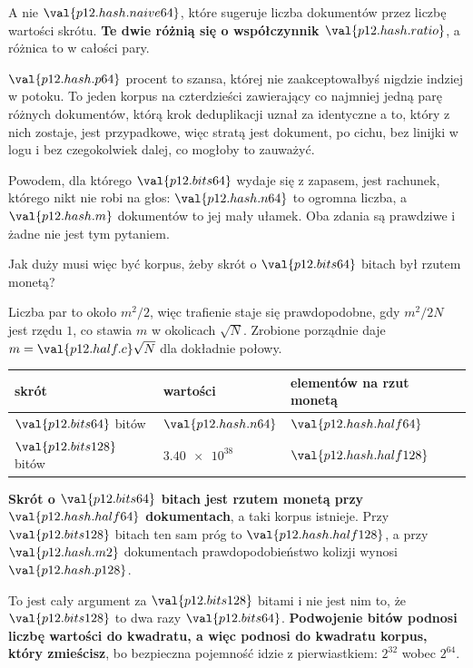 \begin{fr}
A nie $\val{p12.hash.naive64}$, które sugeruje liczba dokumentów przez liczbę
wartości skrótu. \textbf{Te dwie różnią się o współczynnik
$\val{p12.hash.ratio}$}, a różnica to w całości pary.

\begin{aibox}
$\val{p12.hash.p64}$ procent to szansa, której nie zaakceptowałbyś nigdzie
indziej w potoku. To jeden korpus na czterdzieści zawierający co najmniej
jedną parę różnych dokumentów, którą krok deduplikacji uznał za identyczne
\dash{} a to, który z nich zostaje, jest przypadkowe, więc stratą jest
dokument, po cichu, bez linijki w logu i bez czegokolwiek dalej, co mogłoby to
zauważyć.

Powodem, dla którego $\val{p12.bits64}$ wydaje się z zapasem, jest rachunek,
którego nikt nie robi na głos: $\val{p12.hash.n64}$ to ogromna liczba, a
$\val{p12.hash.m}$ dokumentów to jej mały ułamek. Oba zdania są prawdziwe i
żadne nie jest tym pytaniem.
\end{aibox}
\end{fr}

\begin{fr}
Jak duży musi więc być korpus, żeby skrót o $\val{p12.bits64}$ bitach był
rzutem monetą?

Liczba par to około $m^{2}/2$, więc trafienie staje się prawdopodobne, gdy
$m^{2}/2N$ jest rzędu $1$, co stawia $m$ w okolicach $\sqrt{N}$. Zrobione
porządnie daje $m = \val{p12.half.c}\sqrt{N}$ dla dokładnie połowy.

\begin{center}
\begin{tabular}{lll}
\toprule
\textbf{skrót} & \textbf{wartości} & \textbf{elementów na rzut monetą} \\
\midrule
$\val{p12.bits64}$ bitów & $\val{p12.hash.n64}$ & $\val{p12.hash.half64}$ \\
$\val{p12.bits128}$ bitów & $\num{3.40e38}$ & $\val{p12.hash.half128}$ \\
\bottomrule
\end{tabular}
\end{center}

\textbf{Skrót o $\val{p12.bits64}$ bitach jest rzutem monetą przy
$\val{p12.hash.half64}$ dokumentach}, a taki korpus istnieje. Przy
$\val{p12.bits128}$ bitach ten sam próg to $\val{p12.hash.half128}$, a przy
$\val{p12.hash.m2}$ dokumentach prawdopodobieństwo kolizji wynosi
$\val{p12.hash.p128}$.

To jest cały argument za $\val{p12.bits128}$ bitami i nie jest nim to, że
$\val{p12.bits128}$ to dwa razy $\val{p12.bits64}$. \textbf{Podwojenie bitów
podnosi liczbę wartości do kwadratu, a więc podnosi do kwadratu korpus, który
zmieścisz}, bo bezpieczna pojemność idzie z pierwiastkiem: $2^{32}$ wobec
$2^{64}$.
\end{fr}

